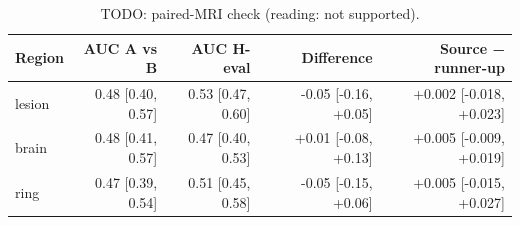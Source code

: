 \begin{table}
\centering
\footnotesize
\begin{tabular}{lrrrr}
\toprule
Region & AUC A vs B & AUC H-eval & Difference & Source − runner-up \\
\midrule
lesion & 0.48 [0.40, 0.57] & 0.53 [0.47, 0.60] & -0.05 [-0.16, +0.05] & +0.002 [-0.018, +0.023] \\
brain & 0.48 [0.41, 0.57] & 0.47 [0.40, 0.53] & +0.01 [-0.08, +0.13] & +0.005 [-0.009, +0.019] \\
ring & 0.47 [0.39, 0.54] & 0.51 [0.45, 0.58] & -0.05 [-0.15, +0.06] & +0.005 [-0.015, +0.027] \\
\bottomrule
\end{tabular}
\caption{TODO: paired-MRI check (reading: not supported).}
\label{tab:paired}
\end{table}
